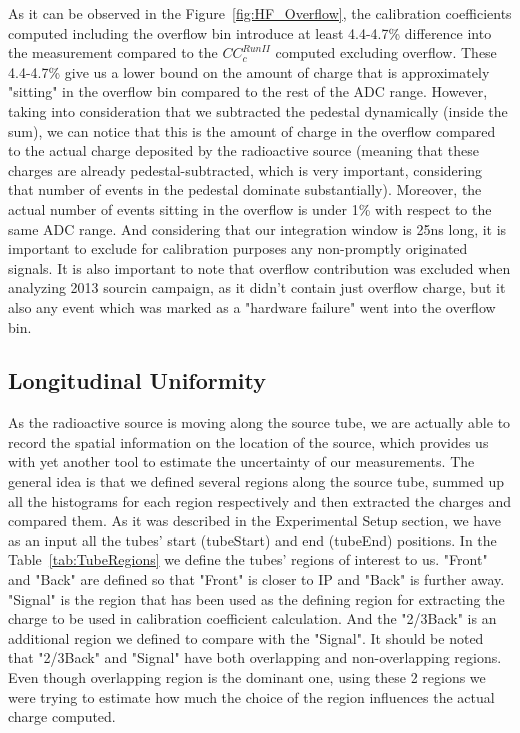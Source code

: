 As it can be observed in the Figure~\ref{fig:HF_Overflow}, the calibration
coefficients computed including the overflow bin introduce at least 4.4-4.7\%
difference into the measurement compared to the ${CC}^{Run II}_{c}$ computed
excluding overflow. These 4.4-4.7\% give us a lower bound on the amount of charge
that is approximately "sitting" in the overflow bin compared to the rest of the
ADC range. However, taking into consideration that we subtracted the pedestal
dynamically (inside the sum), we can notice that this is the amount of charge in
the overflow compared to the actual charge deposited by the radioactive source
(meaning that these charges are already pedestal-subtracted, which is very
important, considering that number of events in the pedestal dominate substantially).
Moreover, the actual number of events sitting in the overflow is under 1\% with
respect to the same ADC range. And considering that our integration window is
25\unit{ns} long, it is important to exclude for calibration purposes any
non-promptly originated signals.
It is also important to note that overflow contribution was excluded when analyzing 2013 sourcin campaign, as it didn't contain just overflow charge, but it also any event which was marked as a "hardware failure" went into the overflow bin.

\subsection{Longitudinal Uniformity}
As the radioactive source is moving along the source tube, we are actually able to
record the spatial information on the location of the source, which provides us
with yet another tool to estimate the uncertainty of our measurements. The general
idea is that we defined several regions along the source tube, summed up all the
histograms for each region respectively and then extracted the charges and
compared them.
As it was described in the Experimental Setup section, we have as an input all
the tubes' start (tubeStart) and end (tubeEnd) positions.
In the Table~\ref{tab:TubeRegions} we define the tubes' regions of interest to us.
"Front" and "Back" are defined so that "Front" is closer to IP and "Back" is further away.
"Signal" is the region that has been used as the defining region for extracting
the charge to be used in calibration coefficient calculation. And the "2/3Back"
is an additional region we defined to compare with the "Signal". It should be
noted that "2/3Back" and "Signal" have both overlapping and non-overlapping
regions. Even though overlapping region is the dominant one, using these 2 regions
we were trying to estimate how much the choice of the region influences the
actual charge computed.

